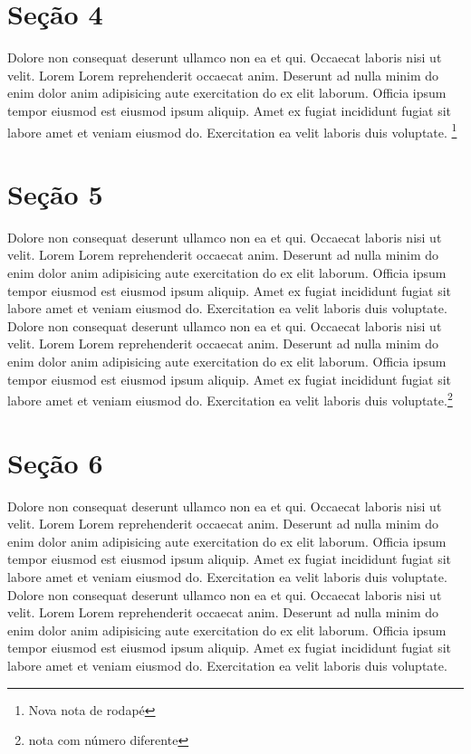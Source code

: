 \documentclass[12pt]{report}
\begin{document}
\section{Seção 4}

Dolore non consequat deserunt ullamco non ea et qui. Occaecat laboris nisi ut velit. Lorem Lorem reprehenderit occaecat anim. Deserunt ad nulla minim do enim dolor anim adipisicing aute exercitation do ex elit laborum. Officia ipsum tempor eiusmod est eiusmod ipsum aliquip. Amet ex fugiat incididunt fugiat sit labore amet et veniam eiusmod do. Exercitation ea velit laboris duis voluptate. \footnote{Nova nota de rodapé}

\section{Seção 5}

Dolore non consequat deserunt ullamco non ea et qui. Occaecat laboris nisi ut velit. Lorem Lorem reprehenderit occaecat anim. Deserunt ad nulla minim do enim dolor anim adipisicing aute exercitation do ex elit laborum. Officia ipsum tempor eiusmod est eiusmod ipsum aliquip. Amet ex fugiat incididunt fugiat sit labore amet et veniam eiusmod do. Exercitation ea velit laboris duis voluptate.
Dolore non consequat deserunt ullamco non ea et qui. Occaecat laboris nisi ut velit. Lorem Lorem reprehenderit occaecat anim. Deserunt ad nulla minim do enim dolor anim adipisicing aute exercitation do ex elit laborum. Officia ipsum tempor eiusmod est eiusmod ipsum aliquip. Amet ex fugiat incididunt fugiat sit labore amet et veniam eiusmod do. Exercitation ea velit laboris duis voluptate.\footnote[5]{nota com número diferente}

\section{Seção 6}

Dolore non consequat deserunt ullamco non ea et qui. Occaecat laboris nisi ut velit. Lorem Lorem reprehenderit occaecat anim. Deserunt ad nulla minim do enim dolor anim adipisicing aute exercitation do ex elit laborum. Officia ipsum tempor eiusmod est eiusmod ipsum aliquip. Amet ex fugiat incididunt fugiat sit labore amet et veniam eiusmod do. Exercitation ea velit laboris duis voluptate.
Dolore non consequat deserunt ullamco non ea et qui. Occaecat laboris nisi ut velit. Lorem Lorem reprehenderit occaecat anim. Deserunt ad nulla minim do enim dolor anim adipisicing aute exercitation do ex elit laborum. Officia ipsum tempor eiusmod est eiusmod ipsum aliquip. Amet ex fugiat incididunt fugiat sit labore amet et veniam eiusmod do. Exercitation ea velit laboris duis voluptate.
\end{document}
